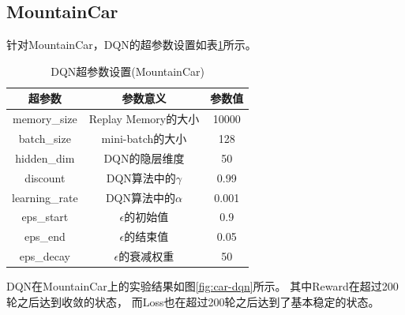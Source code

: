 \documentclass[a4paper,UTF8]{article}
\theoremstyle{definition}
\begin{document}
\subsection*{MountainCar}

针对MountainCar，DQN的超参数设置如表\ref{tab:car-dqn}所示。

\begin{table}[H]
	\centering
	\begin{tabular}{ccc}
		\toprule
		超参数 & 参数意义 & 参数值 \\
		\midrule
		memory\_size & Replay Memory的大小 & 10000 \\
		batch\_size & mini-batch的大小 & 128 \\
		hidden\_dim & DQN的隐层维度 & 50 \\
		discount & DQN算法中的$\gamma$ & 0.99 \\
		learning\_rate & DQN算法中的$\alpha$ & 0.001 \\
		eps\_start & $\epsilon$的初始值 & 0.9 \\
		eps\_end & $\epsilon$的结束值 & 0.05 \\
		eps\_decay & $\epsilon$的衰减权重 & 50 \\
		\bottomrule
	\end{tabular}
	\caption{DQN超参数设置(MountainCar)}\label{tab:car-dqn}
\end{table}

DQN在MountainCar上的实验结果如图\ref{fig:car-dqn}所示。
其中Reward在超过200轮之后达到收敛的状态，
而Loss也在超过200轮之后达到了基本稳定的状态。
\end{document}
